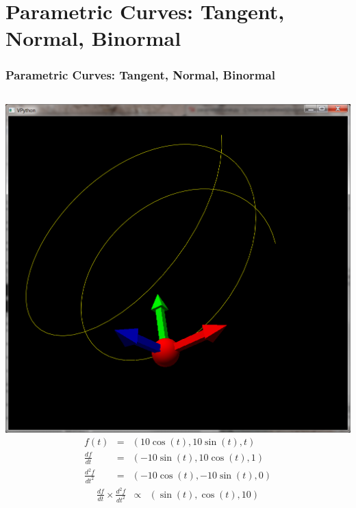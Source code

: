 \documentclass[slidestop,xcolor=pst]{beamer}
\newcommand{\sect}[1]{
\section{#1}
\begin{frame}[fragile]\frametitle{#1}
}
\begin{document}
\sect{Parametric Curves: Tangent, Normal, Binormal}
\begin{columns}[c]
\includegraphics[width=\textwidth]{images/vpythoncurveframe.png}
\begin{eqnarray*}
f(t) &=& (10\cos(t), 10\sin(t), t)\\
\frac{df}{dt} &=& (-10\sin(t), 10\cos(t), 1)\\
\frac{d^2f}{dt^2} &=& (-10\cos(t), -10\sin(t), 0)
\end{eqnarray*}
\begin{eqnarray*}
\frac{df}{dt}\times \frac{d^2f}{dt^2} &\propto& (\sin(t), \cos(t), 10)
\end{eqnarray*}
\end{columns}
\end{frame}
\end{document}
